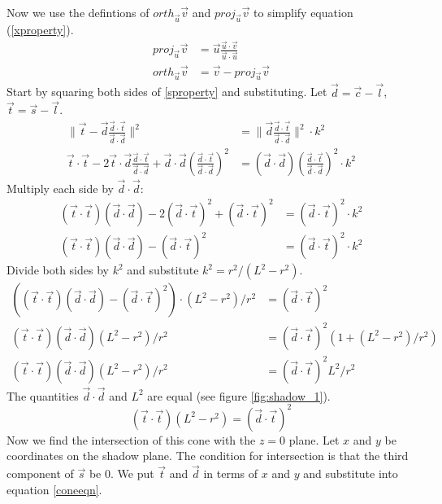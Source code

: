 \documentclass[10pt]{article}
\begin{document}
\begin{appendices}
Now we use the defintions of $orth_{\vec{u}} \vec{v}$ and $proj_{\vec{u}} \vec{v}$ to simplify equation (\ref{xproperty}).
\begin{align*}
proj_{\vec{u}} \vec{v} &= \vec{u} \frac{\vec{u}\cdot\vec{v}}{\vec{u}\cdot\vec{u}}\\
orth_{\vec{u}} \vec{v} &= \vec{v} - proj_{\vec{u}} \vec{v}
\end{align*}
Start by squaring both sides of \ref{sproperty} and substituting. Let $\vec{d} = \vec{c}-\vec{l}$, $\vec{t} = \vec{s}-\vec{l}$.
\begin{align*}
\|\vec{t} - \vec{d} \frac{\vec{d}\cdot\vec{t}}{\vec{d}\cdot\vec{d}}\|^2 &= \|\vec{d} \frac{\vec{d}\cdot\vec{t}}{\vec{d}\cdot\vec{d}}\|^2 \cdot k^2\\
\vec{t}\cdot\vec{t}-2\vec{t}\cdot\vec{d} \frac{\vec{d}\cdot\vec{t}}{\vec{d}\cdot\vec{d}}+\vec{d}\cdot\vec{d}(\frac{\vec{d}\cdot\vec{t}}{\vec{d}\cdot\vec{d}})^2 &= (\vec{d}\cdot\vec{d}) (\frac{\vec{d}\cdot\vec{t}}{\vec{d}\cdot\vec{d}})^2 \cdot k^2
\end{align*}
Multiply each side by $\vec{d}\cdot\vec{d}$:
\begin{align*}
(\vec{t}\cdot\vec{t})(\vec{d}\cdot\vec{d})-2(\vec{d}\cdot\vec{t})^2+(\vec{d}\cdot\vec{t})^2  &= (\vec{d}\cdot\vec{t})^2 \cdot k^2\\
(\vec{t}\cdot\vec{t})(\vec{d}\cdot\vec{d})-(\vec{d}\cdot\vec{t})^2 & = (\vec{d}\cdot\vec{t})^2 \cdot k^2
\end{align*}
Divide both sides by $k^2$ and substitute $k^2 = r^2 / ( L^2-r^2)$.
\begin{align*}
((\vec{t}\cdot\vec{t})(\vec{d}\cdot\vec{d})-(\vec{d}\cdot\vec{t})^2)\cdot ( L^2-r^2)/r^2 &=  (\vec{d}\cdot\vec{t})^2\\
(\vec{t}\cdot\vec{t})(\vec{d}\cdot\vec{d})( L^2-r^2)/r^2 &=  (\vec{d}\cdot\vec{t})^2(1 + ( L^2-r^2)/r^2)\\
(\vec{t}\cdot\vec{t})(\vec{d}\cdot\vec{d})( L^2-r^2)/r^2 &=  (\vec{d}\cdot\vec{t})^2 L^2/r^2
\end{align*}
The quantities $\vec{d}\cdot\vec{d}$ and $L^2$ are equal (see figure \ref{fig:shadow_1}).
\begin{equation}\label{coneeqn}
(\vec{t}\cdot\vec{t})( L^2-r^2) =  (\vec{d}\cdot\vec{t})^2
\end{equation}
Now we find the intersection of this cone with the $z=0$ plane. Let $x$ and $y$ be coordinates on the shadow plane. The condition for intersection is that the third component of $\vec{s}$ be $0$. We put $\vec{t}$ and $\vec{d}$ in terms of $x$ and $y$ and substitute into equation \ref{coneeqn}.

\end{appendices}
\end{document}
